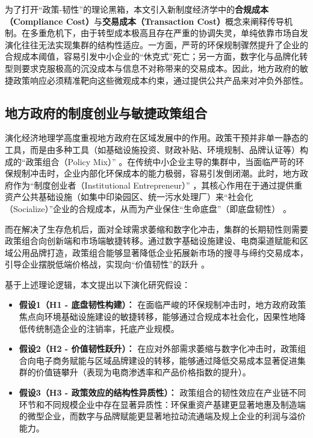 \documentclass[12pt,a4paper]{ctexart}
\begin{document}
为了打开“政策-韧性”的理论黑箱，本文引入新制度经济学中的\textbf{合规成本（Compliance Cost）}与\textbf{交易成本（Transaction Cost）}概念来阐释传导机制。在多重危机下，由于转型成本极高且存在严重的协调失灵，单纯依靠市场自发演化往往无法实现集群的结构性适应。一方面，严苛的环保规制骤然提升了企业的合规成本阈值，容易引发中小企业的“休克式”死亡；另一方面，数字化与品牌化转型则要求克服极高的沉没成本与信息不对称带来的交易成本。因此，地方政府的敏捷政策响应必须精准靶向这些微观成本约束，通过提供公共产品来对冲负外部性。

\subsection{地方政府的制度创业与敏捷政策组合}
演化经济地理学高度重视地方政府在区域发展中的作用。政策干预并非单一静态的工具，而是由多种工具（如基础设施投资、财政补贴、环境规制、品牌认证等）构成的“政策组合（Policy Mix）” \cite{Flanagan2011}。在传统中小企业主导的集群中，当面临严苛的环保规制冲击时，企业内部化环保成本的能力极弱，容易引发倒闭潮。此时，地方政府作为“制度创业者（Institutional Entrepreneur）” \cite{Sotarauta2017}，其核心作用在于通过提供重资产公共基础设施（如集中印染园区、统一污水处理厂）来“社会化（Socialize）”企业的合规成本，从而为产业保住“生命底盘”（即底盘韧性） \cite{Li2022}。

而在解决了生存危机后，面对全球需求萎缩和数字化冲击，集群的长期韧性则需要政策组合向创新端和市场端敏捷转移。通过数字基础设施建设、电商渠道赋能和区域公用品牌打造，政策组合能够显著降低企业拓展新市场的搜寻与缔约交易成本，引导企业摆脱低端价格战，实现向“价值韧性”的跃升 \cite{Sun2023}。

基于上述理论逻辑，本文提出以下演化研究假设：
\begin{itemize}
    \item \textbf{假设1（H1 - 底盘韧性构建）：} 在面临严峻的环保规制冲击时，地方政府政策焦点向环境基础设施建设的敏捷转移，能够通过合规成本社会化，因果性地降低传统制造企业的注销率，托底产业规模。
    \item \textbf{假设2（H2 - 价值韧性跃升）：} 在应对外部需求萎缩与数字化冲击时，政策组合向电子商务赋能与区域品牌建设的转移，能够通过降低交易成本显著促进集群的价值链攀升（表现为电商渗透率和产品价格指数的提升）。
    \item \textbf{假设3（H3 - 政策效应的结构性异质性）：} 政策组合的韧性效应在产业链不同环节和不同规模企业中存在显著异质性：环保重资产基建更显著地惠及制造端的微型企业，而数字与品牌赋能更显著地拉动流通端及规上企业的利润与溢价能力。
\end{itemize}
\end{document}
